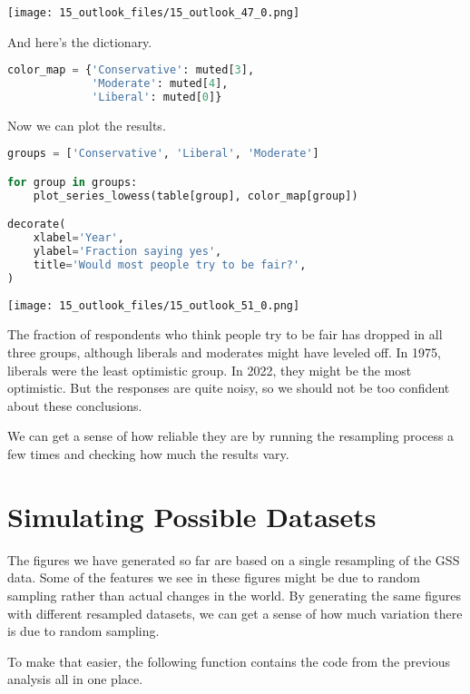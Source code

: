 \begin{center}
\texttt{[image: 15\_outlook\_files/15\_outlook\_47\_0.png]}
\end{center}

And here's the dictionary.

\begin{lstlisting}[language=Python,style=source]
color_map = {'Conservative': muted[3], 
             'Moderate': muted[4], 
             'Liberal': muted[0]}
\end{lstlisting}

Now we can plot the results.

\begin{lstlisting}[language=Python,style=source]
groups = ['Conservative', 'Liberal', 'Moderate']

for group in groups:
    plot_series_lowess(table[group], color_map[group])

decorate(
    xlabel='Year',
    ylabel='Fraction saying yes',
    title='Would most people try to be fair?',
)
\end{lstlisting}

\begin{center}
\texttt{[image: 15\_outlook\_files/15\_outlook\_51\_0.png]}
\end{center}

The fraction of respondents who think people try to be fair has dropped
in all three groups, although liberals and moderates might have leveled
off. In 1975, liberals were the least optimistic group. In 2022, they
might be the most optimistic. But the responses are quite noisy, so we
should not be too confident about these conclusions.

We can get a sense of how reliable they are by running the resampling
process a few times and checking how much the results vary.

\section{Simulating Possible
Datasets}\label{simulating-possible-datasets}

The figures we have generated so far are based on a single resampling of
the GSS data. Some of the features we see in these figures might be due
to random sampling rather than actual changes in the world. By
generating the same figures with different resampled datasets, we can
get a sense of how much variation there is due to random sampling.

To make that easier, the following function contains the code from the
previous analysis all in one place.

